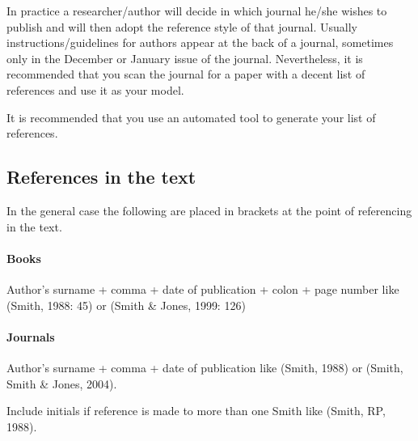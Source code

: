 \documentclass[a5paper, 10pt]{article}
\begin{document}
In practice a researcher/author will decide in which journal he/she
wishes to publish and will then adopt the reference style of that
journal.  Usually instructions/guidelines for authors appear at the
back of a journal, sometimes only in the December or January issue of
the journal.  Nevertheless, it is recommended that you scan the
journal for a paper with a decent list of references and use it as
your model.

It is recommended that you use an automated tool to generate your list of references.

\subsection{References in the text}

In the general case the following are placed in brackets at the point
of referencing in the text.

\paragraph{Books} Author's surname + comma + date of publication + colon +
page number like (Smith, 1988: 45) or (Smith \& Jones, 1999: 126)

\paragraph{Journals} Author's surname + comma + date of publication like
(Smith, 1988) or (Smith, Smith \& Jones, 2004).

Include initials if reference is made to more than one Smith like
(Smith, RP, 1988).
\end{document}
